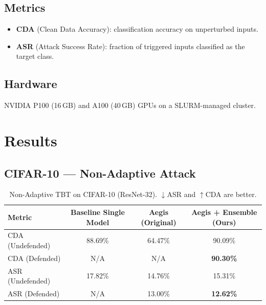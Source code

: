 \documentclass[12pt,a4paper]{article}
\newcommand{\asr}{\textsc{ASR}}
\newcommand{\cda}{\textsc{CDA}}
\newcommand{\tbt}{\textsc{TBT}}
\begin{document}
\subsection{Metrics}

\begin{itemize}
    \item \textbf{\cda{}} (Clean Data Accuracy): classification accuracy on unperturbed inputs.
    \item \textbf{\asr{}} (Attack Success Rate): fraction of triggered inputs classified as the target class.
\end{itemize}

\subsection{Hardware}

NVIDIA P100 (16\,GB) and A100 (40\,GB) GPUs on a SLURM-managed cluster.

\section{Results}
\label{sec:results}

\subsection{CIFAR-10 --- Non-Adaptive Attack}

\begin{table}[H]
    \centering
    \caption{Non-Adaptive \tbt{} on CIFAR-10 (ResNet-32). $\downarrow$\asr{} and $\uparrow$\cda{} are better.}
    \label{tab:cifar10_nonadaptive}
    \begin{tabular}{lccc}
        \toprule
        \textbf{Metric} & \textbf{Baseline Single Model} & \textbf{Aegis (Original)} & \textbf{Aegis + Ensemble (Ours)} \\
        \midrule
        \cda{} (Undefended) & 88.69\% & 64.47\% & 90.09\% \\
        \cda{} (Defended)   & N/A     & N/A      & \textbf{90.30\%} \\
        \midrule
        \asr{} (Undefended) & 17.82\% & 14.76\% & 15.31\% \\
        \asr{} (Defended)   & N/A     & 13.00\% & \textbf{12.62\%} \\
        \bottomrule
    \end{tabular}
\end{table}
\end{document}

